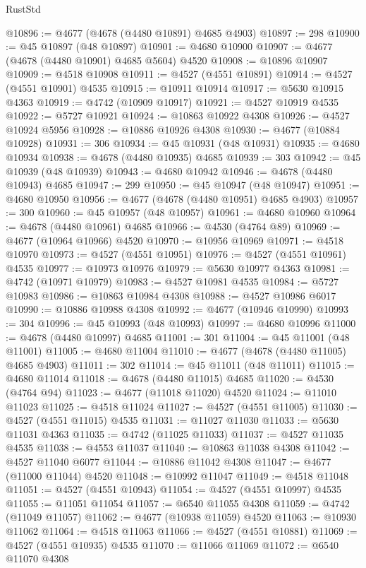\begin{lexlean}{RustStd}
\begin{coremodule}
@10896 := @4677 (@4678 (@4480 @10891) @4685 @4903)
@10897 := 298
@10900 := @45 @10897 (@48 @10897)
@10901 := @4680 @10900
@10907 := @4677 (@4678 (@4480 @10901) @4685 @5604) @4520
@10908 := @10896 @10907
@10909 := @4518 @10908
@10911 := @4527 (@4551 @10891)
@10914 := @4527 (@4551 @10901) @4535
@10915 := @10911 @10914
@10917 := @5630 @10915 @4363
@10919 := @4742 (@10909 @10917)
@10921 := @4527 @10919 @4535
@10922 := @5727 @10921
@10924 := @10863 @10922 @4308
@10926 := @4527 @10924 @5956
@10928 := @10886 @10926 @4308
@10930 := @4677 (@10884 @10928)
@10931 := 306
@10934 := @45 @10931 (@48 @10931)
@10935 := @4680 @10934
@10938 := @4678 (@4480 @10935) @4685
@10939 := 303
@10942 := @45 @10939 (@48 @10939)
@10943 := @4680 @10942
@10946 := @4678 (@4480 @10943) @4685
@10947 := 299
@10950 := @45 @10947 (@48 @10947)
@10951 := @4680 @10950
@10956 := @4677 (@4678 (@4480 @10951) @4685 @4903)
@10957 := 300
@10960 := @45 @10957 (@48 @10957)
@10961 := @4680 @10960
@10964 := @4678 (@4480 @10961) @4685
@10966 := @4530 (@4764 @89)
@10969 := @4677 (@10964 @10966) @4520
@10970 := @10956 @10969
@10971 := @4518 @10970
@10973 := @4527 (@4551 @10951)
@10976 := @4527 (@4551 @10961) @4535
@10977 := @10973 @10976
@10979 := @5630 @10977 @4363
@10981 := @4742 (@10971 @10979)
@10983 := @4527 @10981 @4535
@10984 := @5727 @10983
@10986 := @10863 @10984 @4308
@10988 := @4527 @10986 @6017
@10990 := @10886 @10988 @4308
@10992 := @4677 (@10946 @10990)
@10993 := 304
@10996 := @45 @10993 (@48 @10993)
@10997 := @4680 @10996
@11000 := @4678 (@4480 @10997) @4685
@11001 := 301
@11004 := @45 @11001 (@48 @11001)
@11005 := @4680 @11004
@11010 := @4677 (@4678 (@4480 @11005) @4685 @4903)
@11011 := 302
@11014 := @45 @11011 (@48 @11011)
@11015 := @4680 @11014
@11018 := @4678 (@4480 @11015) @4685
@11020 := @4530 (@4764 @94)
@11023 := @4677 (@11018 @11020) @4520
@11024 := @11010 @11023
@11025 := @4518 @11024
@11027 := @4527 (@4551 @11005)
@11030 := @4527 (@4551 @11015) @4535
@11031 := @11027 @11030
@11033 := @5630 @11031 @4363
@11035 := @4742 (@11025 @11033)
@11037 := @4527 @11035 @4535
@11038 := @4553 @11037
@11040 := @10863 @11038 @4308
@11042 := @4527 @11040 @6077
@11044 := @10886 @11042 @4308
@11047 := @4677 (@11000 @11044) @4520
@11048 := @10992 @11047
@11049 := @4518 @11048
@11051 := @4527 (@4551 @10943)
@11054 := @4527 (@4551 @10997) @4535
@11055 := @11051 @11054
@11057 := @6540 @11055 @4308
@11059 := @4742 (@11049 @11057)
@11062 := @4677 (@10938 @11059) @4520
@11063 := @10930 @11062
@11064 := @4518 @11063
@11066 := @4527 (@4551 @10881)
@11069 := @4527 (@4551 @10935) @4535
@11070 := @11066 @11069
@11072 := @6540 @11070 @4308

\end{coremodule}
\end{lexlean}
